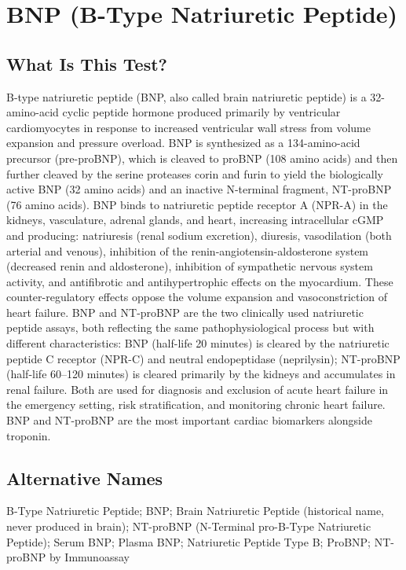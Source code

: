 \chapter{BNP (B-Type Natriuretic Peptide)}

\section*{What Is This Test?}
B-type natriuretic peptide (BNP, also called brain natriuretic peptide) is a 32-amino-acid cyclic peptide hormone produced primarily by ventricular cardiomyocytes in response to increased ventricular wall stress from volume expansion and pressure overload. BNP is synthesized as a 134-amino-acid precursor (pre-proBNP), which is cleaved to proBNP (108 amino acids) and then further cleaved by the serine proteases corin and furin to yield the biologically active BNP (32 amino acids) and an inactive N-terminal fragment, NT-proBNP (76 amino acids). BNP binds to natriuretic peptide receptor A (NPR-A) in the kidneys, vasculature, adrenal glands, and heart, increasing intracellular cGMP and producing: natriuresis (renal sodium excretion), diuresis, vasodilation (both arterial and venous), inhibition of the renin-angiotensin-aldosterone system (decreased renin and aldosterone), inhibition of sympathetic nervous system activity, and antifibrotic and antihypertrophic effects on the myocardium. These counter-regulatory effects oppose the volume expansion and vasoconstriction of heart failure. BNP and NT-proBNP are the two clinically used natriuretic peptide assays, both reflecting the same pathophysiological process but with different characteristics: BNP (half-life 20 minutes) is cleared by the natriuretic peptide C receptor (NPR-C) and neutral endopeptidase (neprilysin); NT-proBNP (half-life 60--120 minutes) is cleared primarily by the kidneys and accumulates in renal failure. Both are used for diagnosis and exclusion of acute heart failure in the emergency setting, risk stratification, and monitoring chronic heart failure. BNP and NT-proBNP are the most important cardiac biomarkers alongside troponin.

\section*{Alternative Names}
B-Type Natriuretic Peptide; BNP; Brain Natriuretic Peptide (historical name, never produced in brain); NT-proBNP (N-Terminal pro-B-Type Natriuretic Peptide); Serum BNP; Plasma BNP; Natriuretic Peptide Type B; ProBNP; NT-proBNP by Immunoassay

